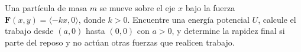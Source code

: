 Una partícula de masa $m$ se mueve sobre el eje $x$ bajo la fuerza $\mathbf{F}(x,y)=\langle-kx,0\rangle$, donde $k>0$. Encuentre una energía potencial $U$, calcule el trabajo desde $(a,0)$ hasta $(0,0)$ con $a>0$, y determine la rapidez final si parte del reposo y no actúan otras fuerzas que realicen trabajo.
